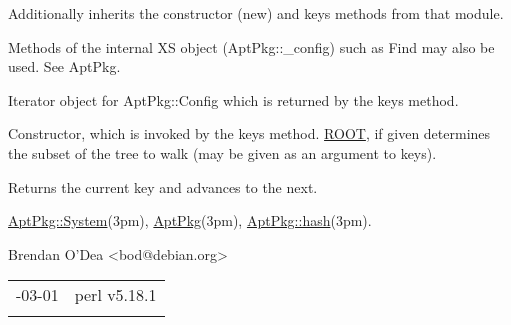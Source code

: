 \documentclass[]{article}
\renewcommand{\emph}[1]{\underline{#1}}
\begin{document}
Additionally inherits the constructor (new) and keys methods from that
module.

Methods of the internal XS object (AptPkg::\_config) such as Find may
also be used. See AptPkg.


Iterator object for AptPkg::Config which is returned by the keys method.

\begin{description}
\itemsep1pt\parskip0pt
\item[new(\emph{XS\_OBJ}, {[}\emph{ROOT}{]})]
Constructor, which is invoked by the keys method. \emph{ROOT}, if given
determines the subset of the tree to walk (may be given as an argument
to keys).
\end{description}

\begin{description}
\itemsep1pt\parskip0pt
\item[next]
Returns the current key and advances to the next.
\end{description}


\emph{AptPkg::System}(3pm), \emph{AptPkg}(3pm),
\emph{AptPkg::hash}(3pm).


Brendan O'Dea \textless{}bod@debian.org\textgreater{}

\begin{longtable}[c]{@{}ll@{}}
\toprule\addlinespace
2013-03-01 & perl v5.18.1
\\\addlinespace
\bottomrule
\end{longtable}
\end{document}
